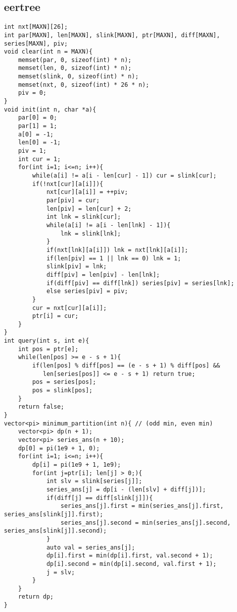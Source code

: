 \documentclass[landscape, 8pt, a4paper, oneside, twocolumn]{extarticle}
\begin{document}
\subsection{eertree}
\begin{verbatim}
int nxt[MAXN][26];
int par[MAXN], len[MAXN], slink[MAXN], ptr[MAXN], diff[MAXN], series[MAXN], piv;
void clear(int n = MAXN){
	memset(par, 0, sizeof(int) * n);
	memset(len, 0, sizeof(int) * n);
	memset(slink, 0, sizeof(int) * n);
	memset(nxt, 0, sizeof(int) * 26 * n);
	piv = 0;
}
void init(int n, char *a){
	par[0] = 0;
	par[1] = 1;
	a[0] = -1;
	len[0] = -1;
	piv = 1;
	int cur = 1;
	for(int i=1; i<=n; i++){
		while(a[i] != a[i - len[cur] - 1]) cur = slink[cur];
		if(!nxt[cur][a[i]]){
			nxt[cur][a[i]] = ++piv;
			par[piv] = cur;
			len[piv] = len[cur] + 2;
			int lnk = slink[cur];
			while(a[i] != a[i - len[lnk] - 1]){
				lnk = slink[lnk];
			}
			if(nxt[lnk][a[i]]) lnk = nxt[lnk][a[i]];
			if(len[piv] == 1 || lnk == 0) lnk = 1;
			slink[piv] = lnk;
			diff[piv] = len[piv] - len[lnk];
			if(diff[piv] == diff[lnk]) series[piv] = series[lnk];
			else series[piv] = piv;
		}
		cur = nxt[cur][a[i]];
		ptr[i] = cur;
	}
}
int query(int s, int e){
	int pos = ptr[e];
	while(len[pos] >= e - s + 1){
        if(len[pos] % diff[pos] == (e - s + 1) % diff[pos] &&
           len[series[pos]] <= e - s + 1) return true;
        pos = series[pos];
        pos = slink[pos];
	}
	return false;
}
vector<pi> minimum_partition(int n){ // (odd min, even min)
	vector<pi> dp(n + 1);
	vector<pi> series_ans(n + 10);
	dp[0] = pi(1e9 + 1, 0);
	for(int i=1; i<=n; i++){
		dp[i] = pi(1e9 + 1, 1e9);
		for(int j=ptr[i]; len[j] > 0;){
			int slv = slink[series[j]];
			series_ans[j] = dp[i - (len[slv] + diff[j])];
			if(diff[j] == diff[slink[j]]){
				series_ans[j].first = min(series_ans[j].first, series_ans[slink[j]].first);
				series_ans[j].second = min(series_ans[j].second, series_ans[slink[j]].second);
			}
			auto val = series_ans[j];
			dp[i].first = min(dp[i].first, val.second + 1);
			dp[i].second = min(dp[i].second, val.first + 1);
			j = slv;
		}
	}
	return dp;
}
\end{verbatim}
\end{document}

